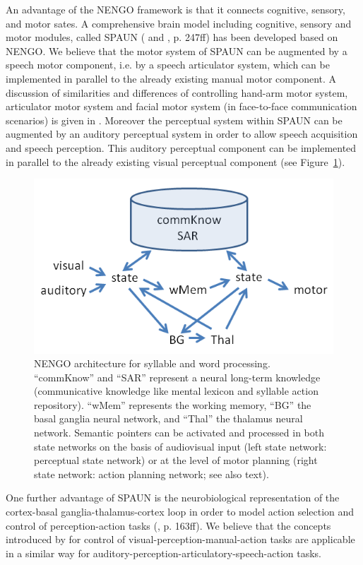 \documentclass[conference]{IEEEtran}
\begin{document}
An advantage of the NENGO framework is that it connects cognitive,
sensory, and motor sates. A comprehensive brain model including
cognitive, sensory and motor modules, called SPAUN
(\cite{eliasmith2012} and \cite{eliasmith2013}, p. 247ff) has been
developed based on NENGO. We believe that the motor system of SPAUN
can be augmented by a speech motor component, i.e. by a speech
articulator system, which can be implemented in parallel to the
already existing manual motor component. A discussion of similarities
and differences of controlling hand-arm motor system, articulator
motor system and facial motor system (in face-to-face communication
scenarios) is given in \cite{kroger2010}. Moreover the perceptual
system within SPAUN can be augmented by an auditory perceptual system
in order to allow speech acquisition and speech perception. This
auditory perceptual component can be implemented in parallel to the
already existing visual perceptual component (see
Figure~\ref{fig:model}).

\begin{figure}[!t]
\centering
\includegraphics[width=\columnwidth]{model}
\caption{NENGO architecture for syllable and word processing.
  ``commKnow'' and ``SAR'' represent a neural long-term knowledge
  (communicative knowledge like mental lexicon and syllable action
  repository). ``wMem'' represents the working memory, ``BG'' the
  basal ganglia neural network, and ``Thal'' the thalamus neural
  network. Semantic pointers can be activated and processed in both
  state networks on the basis of audiovisual input (left state
  network: perceptual state network) or at the level of motor planning
  (right state network: action planning network; see also text).}
\label{fig:model}
\end{figure}

One further advantage of SPAUN is the neurobiological representation
of the cortex-basal ganglia-thalamus-cortex loop in order to model
action selection and control of perception-action tasks
(\cite{eliasmith2013}, p. 163ff). We believe that the concepts
introduced by \cite{eliasmith2013} for control of
visual-perception-manual-action tasks are applicable in a similar way
for auditory-perception-articulatory-speech-action tasks.
\end{document}
